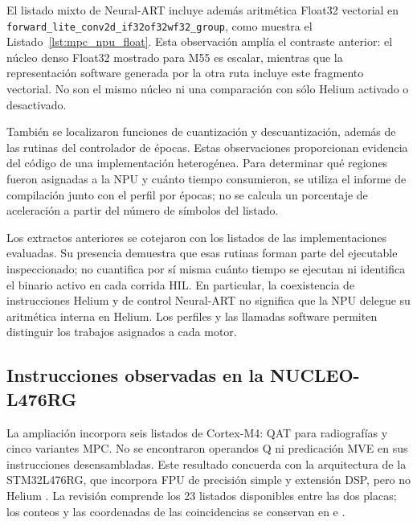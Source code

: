 El listado mixto de Neural-ART incluye además aritmética Float32 vectorial en \texttt{forward\_\allowbreak lite\_\allowbreak conv2d\_\allowbreak if32of32wf32\_\allowbreak group}, como muestra el Listado~\ref{lst:mpc_npu_float}. Esta observación amplía el contraste anterior: el núcleo denso Float32 mostrado para M55 es escalar, mientras que la representación software generada por la otra ruta incluye este fragmento vectorial. No son el mismo núcleo ni una comparación con sólo Helium activado o desactivado.


\noindent\begin{minipage}{\linewidth}

\end{minipage}

También se localizaron funciones de cuantización y descuantización, además de las rutinas del controlador de épocas. Estas observaciones proporcionan evidencia del código de una implementación heterogénea. Para determinar qué regiones fueron asignadas a la NPU y cuánto tiempo consumieron, se utiliza el informe de compilación junto con el perfil por épocas; no se calcula un porcentaje de aceleración a partir del número de símbolos del listado.

Los extractos anteriores se cotejaron con los listados de las implementaciones evaluadas. Su presencia demuestra que esas rutinas forman parte del ejecutable inspeccionado; no cuantifica por sí misma cuánto tiempo se ejecutan ni identifica el binario activo en cada corrida HIL. En particular, la coexistencia de instrucciones Helium y de control Neural-ART no significa que la NPU delegue su aritmética interna en Helium. Los perfiles y las llamadas software permiten distinguir los trabajos asignados a cada motor.

\FloatBarrier
\subsection{Instrucciones observadas en la NUCLEO-L476RG}\label{sec:evidencia_l476}
La ampliación incorpora seis listados de Cortex-M4: QAT para radiografías y cinco variantes MPC. No se encontraron operandos Q ni predicación MVE en sus instrucciones desensambladas. Este resultado concuerda con la arquitectura de la STM32L476RG, que incorpora FPU de precisión simple y extensión DSP, pero no Helium \cite{res_stl476}. La revisión comprende los 23 listados disponibles entre las dos placas; los conteos y las coordenadas de las coincidencias se conservan en  e .


